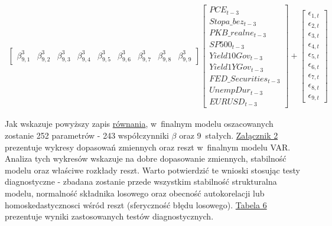 \begin{equation}
\begin{aligned}
\begin{bmatrix}
\beta^3_{9,1} & \beta^3_{9,2} & \beta^3_{9,3} & \beta^3_{9,4} & \beta^3_{9,5} & \beta^3_{9,6} & \beta^3_{9,7} & \beta^3_{9,8} &   \beta^3_{9,9}
\end{bmatrix}
\begin{bmatrix}
       PCE_{t-3} \\[0.05em]
       Stopa\_bez_{t-3} \\[0.05em]
       PKB\_realne_{t-3} \\[0.05em]
       SP500_{t-3} \\[0.05em]
       Yield10Gov_{t-3} \\[0.05em]
       Yield1YGov_{t-3} \\[0.05em]
       FED\_Securities_{t-3} \\[0.05em]
       UnempDur_{t-3} \\[0.05em]
       EURUSD_{t-3} 
\end{bmatrix} +
\begin{bmatrix}
       \epsilon_{1,t}  \\[0.05em]
       \epsilon_{2,t}  \\[0.05em]
       \epsilon_{3,t}  \\[0.05em]
       \epsilon_{4,t}  \\[0.05em]
       \epsilon_{5,t}  \\[0.05em]
       \epsilon_{6,t}  \\[0.05em]
       \epsilon_{7,t}  \\[0.05em] 
       \epsilon_{8,t}  \\[0.05em]
       \epsilon_{9,t}  
\end{bmatrix}
\end{aligned}
\end{equation}
\normalsize

\noindent Jak wskazuje powyższy zapis \hyperlink{row22}{równania}, w~finalnym modelu oszacowanych zostanie 252 parametrów - 243 współczynniki $\beta$ oraz 9~stałych. \hyperlink{zal2}{Załącznik 2} prezentuje wykresy dopasowań zmiennych oraz reszt w~finalnym modelu \acs{VAR}. Analiza tych wykresów wskazuje na dobre dopasowanie zmiennych, stabilność modelu oraz właściwe rozkłady reszt. Warto potwierdzić te wnioski stosując testy diagnostyczne - zbadana zostanie przede wszystkim stabilność strukturalna modelu, normalność składnika losowego oraz obecność autokorelacji lub homoskedastycznosci wśród reszt (sferyczność błędu losowego). \hyperlink{tab5}{Tabela 6} prezentuje wyniki zastosowanych testów diagnostycznych. 

